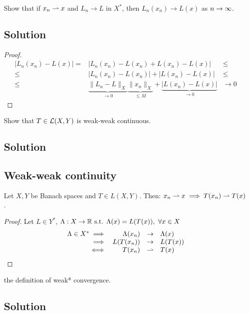 
\question
Show that if $x_n \rightharpoonup x$ and $L_n \to L$ in $X^*$, then $L_n(x_n) \to L(x)$ as $n\to\infty$.

\subsection*{Solution}

\begin{proof}
    \[
    \begin{array}{rll}
       \lvert L_n(x_n)-L(x)\rvert =  & \lvert L_n(x_n)-L(x_n)+L(x_n)-L(x)\rvert &\le     \\
         \le&\lvert L_n(x_n)-L(x_n)\rvert +\lvert L(x_n)-L(x)\rvert &\le\\
        \le & \underbrace{\|L_n-L\|_X}_{\to 0}\underbrace{\|x_n\|_X}_{\le M}+\underbrace{\lvert L(x_n)-L(x)\rvert}_{\to 0} &\to 0
    \end{array}
    \]
\end{proof}


\question
Show that $T \in \mathcal{L}(X, Y )$ is weak-weak continuous.

\subsection*{Solution}

\subsection{Weak-weak continuity}
Let $X,Y$ be Banach spaces and $T \in L(X, Y)$. Then: $x_n \rightharpoonup x \implies T(x_n) \rightharpoonup T(x)$.
\begin{proof}
    Let $L\in Y^*$, $\Lambda : X\to \mathbb{R} \mbox{ s.t. } \Lambda(x)=L(T(x)),\,\,\forall x\in X$
    \[ \begin{array}{rrcl}
       \Lambda \in X^* \implies &\Lambda (x_n)  & \to & \Lambda(x)\\
       \implies& L(T(x_n)) & \to & L(T(x))\\
         \iff& T(x_n) & \rightharpoonup & T(x)
   \end{array}\]
\end{proof}


\question
the definition of weak* convergence.

\subsection*{Solution}

